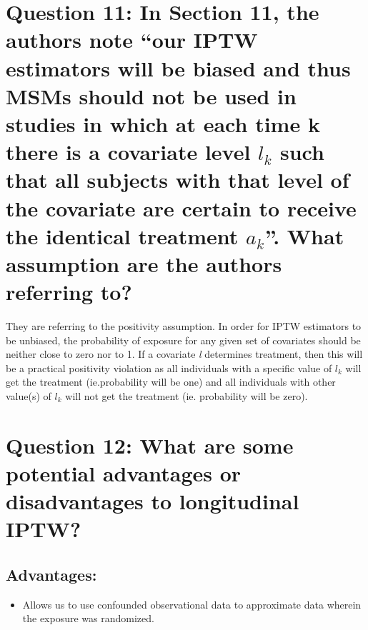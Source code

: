 \documentclass[]{article}
\providecommand{\tightlist}{%
  \setlength{\itemsep}{0pt}\setlength{\parskip}{0pt}}
\begin{document}
\section{\texorpdfstring{Question 11: In Section 11, the authors note
``our IPTW estimators will be biased and thus MSMs should not be used in
studies in which at each time k there is a covariate level \(l_k\) such
that all subjects with that level of the covariate are certain to
receive the identical treatment \(a_k\)''. What assumption are the
authors referring
to?}{Question 11: In Section 11, the authors note our IPTW estimators will be biased and thus MSMs should not be used in studies in which at each time k there is a covariate level l\_k such that all subjects with that level of the covariate are certain to receive the identical treatment a\_k. What assumption are the authors referring to?}}\label{question-11-in-section-11-the-authors-note-our-iptw-estimators-will-be-biased-and-thus-msms-should-not-be-used-in-studies-in-which-at-each-time-k-there-is-a-covariate-level-l_k-such-that-all-subjects-with-that-level-of-the-covariate-are-certain-to-receive-the-identical-treatment-a_k.-what-assumption-are-the-authors-referring-to}

They are referring to the positivity assumption. In order for IPTW
estimators to be unbiased, the probability of exposure for any given set
of covariates should be neither close to zero nor to 1. If a covariate
\emph{l} determines treatment, then this will be a practical positivity
violation as all individuals with a specific value of \(l_k\) will get
the treatment (ie.probability will be one) and all individuals with
other value(s) of \(l_k\) will not get the treatment (ie. probability
will be zero).

\section{Question 12: What are some potential advantages or
disadvantages to longitudinal
IPTW?}\label{question-12-what-are-some-potential-advantages-or-disadvantages-to-longitudinal-iptw}

\subsection{Advantages:}\label{advantages}

\begin{itemize}
\tightlist
\item
  Allows us to use confounded observational data to approximate data
  wherein the exposure was randomized.
\end{itemize}
\end{document}
